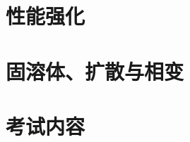 \documentclass[12pt]{book}
\numberwithin{equation}{section}
\begin{document}
\part{性能强化}
	
	
	
	
\part{固溶体、扩散与相变}
	
	
	
\part{考试内容}
	
\clearpage

\backmatter


{}
{}
\printindex

\cleardoublepage
{}
{}


\end{document}
